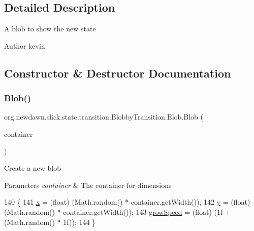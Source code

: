 \subsection{Detailed Description}
A blob to show the new state

\begin{DoxyAuthor}{Author}
kevin 
\end{DoxyAuthor}


\subsection{Constructor \& Destructor Documentation}
\mbox{\label{classorg_1_1newdawn_1_1slick_1_1state_1_1transition_1_1_blobby_transition_1_1_blob_ab1b40eda2938b706839b2dbf57b6a02e}} 
\subsubsection{\texorpdfstring{Blob()}{Blob()}}
{\footnotesize\ttfamily org.\+newdawn.\+slick.\+state.\+transition.\+Blobby\+Transition.\+Blob.\+Blob (\begin{DoxyParamCaption}\item[{\mbox{\hyperlink{classorg_1_1newdawn_1_1slick_1_1_game_container}{Game\+Container}}}]{container }\end{DoxyParamCaption})\hspace{0.3cm}{\ttfamily [inline]}}

Create a new blob


\begin{DoxyParams}{Parameters}
{\em container} & The container for dimensions \\
\hline
\end{DoxyParams}

\begin{DoxyCode}
140                                              \{
141             \mbox{\hyperlink{classorg_1_1newdawn_1_1slick_1_1state_1_1transition_1_1_blobby_transition_1_1_blob_a5026febe6bf250f540a3c1dd931075e0}{x}} = (float) (Math.random() * container.getWidth());
142             \mbox{\hyperlink{classorg_1_1newdawn_1_1slick_1_1state_1_1transition_1_1_blobby_transition_1_1_blob_a0880120ef6ca11df411b7e37a69bdad3}{y}} = (float) (Math.random() * container.getWidth());
143             \mbox{\hyperlink{classorg_1_1newdawn_1_1slick_1_1state_1_1transition_1_1_blobby_transition_1_1_blob_a8fd7600bebcc9b209c3eeee0a83e8dc8}{growSpeed}} = (float) (1f + (Math.random() * 1f));
144         \}
\end{DoxyCode}


